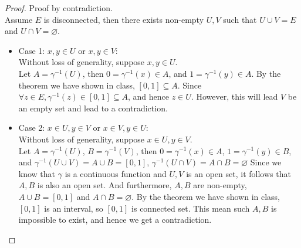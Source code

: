 \begin{proof}
    Proof by contradiction. \\
    Assume $E$ is disconnected, then there exists non-empty $U, V$ such that $U \cup V = E$ and $U \cap V = \varnothing$.
    \begin{itemize}
        \item Case 1: $x,y \in U$ or $x,y \in V$: \\
        Without loss of generality, suppose $x, y \in U$.\\
        Let $A = \gamma^{-1}(U)$, then $0 = \gamma^{-1}(x) \in A$, and $1 = \gamma^{-1}(y) \in A$. By the theorem we have shown in class, $[0,1] \subseteq A$. Since $\forall z \in E, \gamma^{-1}(z) \in [0,1] \subseteq A$, and hence $z \in U$. However, this will lead $V$ be an empty set and lead to a contradiction.
        \item Case 2: $x\in U, y \in V$ or $x \in V, y \in U$: \\
        Without loss of generality, suppose $x\in U, y \in V$. \\
        Let $A = \gamma^{-1}(U)$, $B = \gamma^{-1}(V)$, then $0 = \gamma^{-1}(x) \in A$, $1 = \gamma^{-1}(y) \in B$, and $\gamma^{-1}(U \cup V) = A \cup B = [0,1]$, $\gamma^{-1}(U \cap V) = A \cap B = \varnothing$ Since we know that $\gamma$ is a continuous function and $U, V$ is an open set, it follows that $A, B$ is also an open set. And furthermore, $A, B$ are non-empty, $A \cup B = [0,1]$ and $A \cap B = \varnothing$. By the theorem we have shown in class, $[0,1]$ is an interval, so $[0,1]$ is connected set. This mean such $A, B$ is impossible to exist, and hence we get a contradiction.
    \end{itemize}
\end{proof}

